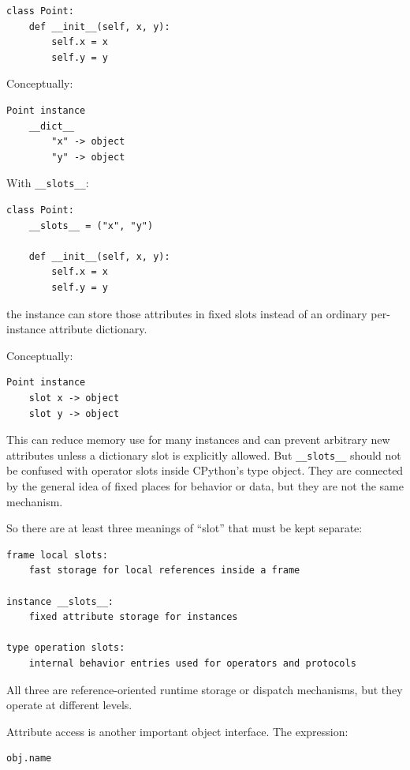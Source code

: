 \begin{verbatim}
class Point:
    def __init__(self, x, y):
        self.x = x
        self.y = y
\end{verbatim}

Conceptually:

\begin{verbatim}
Point instance
    __dict__
        "x" -> object
        "y" -> object
\end{verbatim}

With \texttt{\_\_slots\_\_}:

\begin{verbatim}
class Point:
    __slots__ = ("x", "y")

    def __init__(self, x, y):
        self.x = x
        self.y = y
\end{verbatim}

the instance can store those attributes in fixed slots instead of an ordinary per-instance attribute dictionary.

Conceptually:

\begin{verbatim}
Point instance
    slot x -> object
    slot y -> object
\end{verbatim}

This can reduce memory use for many instances and can prevent arbitrary new attributes unless a dictionary slot is explicitly allowed. But \texttt{\_\_slots\_\_} should not be confused with operator slots inside CPython's type object. They are connected by the general idea of fixed places for behavior or data, but they are not the same mechanism.

So there are at least three meanings of ``slot'' that must be kept separate:

\begin{verbatim}
frame local slots:
    fast storage for local references inside a frame

instance __slots__:
    fixed attribute storage for instances

type operation slots:
    internal behavior entries used for operators and protocols
\end{verbatim}

All three are reference-oriented runtime storage or dispatch mechanisms, but they operate at different levels.

Attribute access is another important object interface. The expression:

\begin{verbatim}
obj.name
\end{verbatim}

